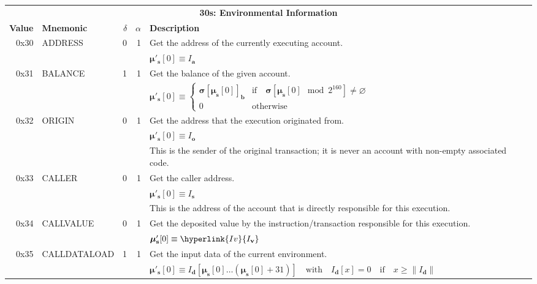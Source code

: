 \documentclass[9pt,oneside]{amsart}
\begin{document}
\begin{tabularx}{\textwidth}{rlrrX}
\toprule
\multicolumn{5}{c}{\textbf{30s: Environmental Information}} \vspace{5pt} \\
\textbf{Value} & \textbf{Mnemonic} & $\delta$ & $\alpha$ & \textbf{Description} \vspace{5pt} \\
0x30 & {\small ADDRESS} & 0 & 1 & Get the address of the currently executing account. \\
&&&& $\boldsymbol{\mu}'_\mathbf{s}[0] \equiv I_\mathbf{a}$ \\
\midrule
0x31 & {\small BALANCE} & 1 & 1 & Get the balance of the given account. \\
&&&& $\boldsymbol{\mu}'_\mathbf{s}[0] \equiv \begin{cases}\boldsymbol{\sigma}[\boldsymbol{\mu}_\mathbf{s}[0]]_\mathbf{b}& \text{if} \quad \boldsymbol{\sigma}[\boldsymbol{\mu}_\mathbf{s}[0] \mod 2^{160}] \neq \varnothing\\0&\text{otherwise}\end{cases}$ \\
\midrule
0x32 & {\small ORIGIN} & 0 & 1 & Get the address that the execution originated from. \\
&&&& $\boldsymbol{\mu}'_\mathbf{s}[0] \equiv I_\mathbf{o}$ \\
&&&& This is the sender of the original transaction; it is never an account with non-empty associated code. \\
\midrule
0x33 & {\small CALLER} & 0 & 1 & Get the caller address. \\
&&&& $\boldsymbol{\mu}'_\mathbf{s}[0] \equiv I_\mathbf{s}$ \\
&&&& This is the address of the account that is directly responsible for this execution. \\
\midrule
0x34 & {\small CALLVALUE} & 0 & 1 & Get the deposited value by the instruction/transaction responsible for this execution. \\
&&&& $\boldsymbol{\mu}'_\mathbf{s}[0] \equiv \hyperlink{I v}{I_\mathbf{v}}$ \\
\midrule
0x35 & {\small CALLDATALOAD} & 1 & 1 & Get the input data of the current environment. \\
&&&& $\boldsymbol{\mu}'_\mathbf{s}[0] \equiv I_\mathbf{d}[ \boldsymbol{\mu}_\mathbf{s}[0] \dots (\boldsymbol{\mu}_\mathbf{s}[0] + 31) ] \quad \text{with} \quad I_\mathbf{d}[x] = 0 \quad \text{if} \quad x \geqslant \lVert I_\mathbf{d} \rVert$ \\

\end{tabularx}
\end{document}
